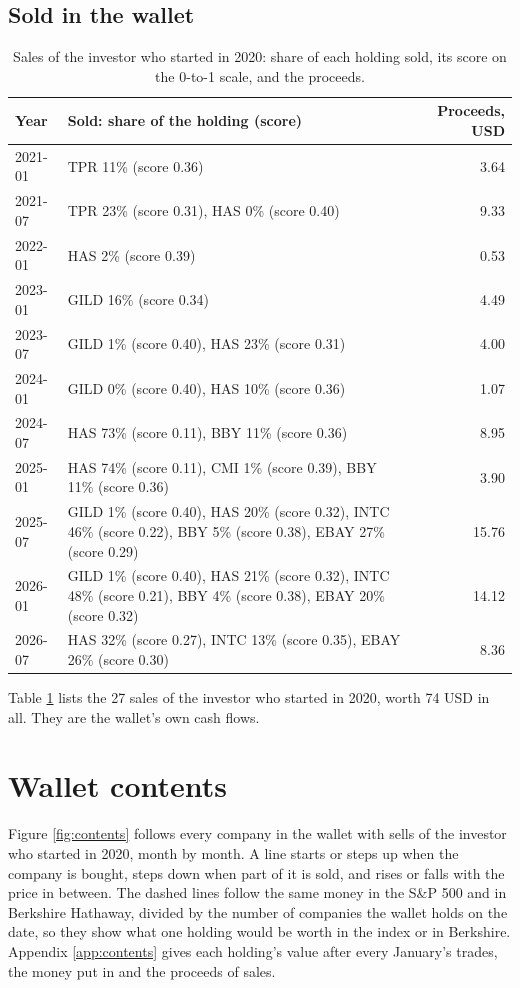 \documentclass[11pt,a4paper]{article}
\begin{document}
\subsection{Sold in the wallet}
\begin{table}[H]
\centering
\small
\caption{Sales of the investor who started in 2020: share of each holding sold, its score on the 0-to-1 scale, and the proceeds.}\label{tab:sales}
\begin{tabular}{l p{11cm} r}
\hline
Year & Sold: share of the holding (score) & Proceeds, USD \\
\hline
2021-01 & TPR 11\% (score 0.36) & 3.64 \\
2021-07 & TPR 23\% (score 0.31), HAS 0\% (score 0.40) & 9.33 \\
2022-01 & HAS 2\% (score 0.39) & 0.53 \\
2023-01 & GILD 16\% (score 0.34) & 4.49 \\
2023-07 & GILD 1\% (score 0.40), HAS 23\% (score 0.31) & 4.00 \\
2024-01 & GILD 0\% (score 0.40), HAS 10\% (score 0.36) & 1.07 \\
2024-07 & HAS 73\% (score 0.11), BBY 11\% (score 0.36) & 8.95 \\
2025-01 & HAS 74\% (score 0.11), CMI 1\% (score 0.39), BBY 11\% (score 0.36) & 3.90 \\
2025-07 & GILD 1\% (score 0.40), HAS 20\% (score 0.32), INTC 46\% (score 0.22), BBY 5\% (score 0.38), EBAY 27\% (score 0.29) & 15.76 \\
2026-01 & GILD 1\% (score 0.40), HAS 21\% (score 0.32), INTC 48\% (score 0.21), BBY 4\% (score 0.38), EBAY 20\% (score 0.32) & 14.12 \\
2026-07 & HAS 32\% (score 0.27), INTC 13\% (score 0.35), EBAY 26\% (score 0.30) & 8.36 \\
\hline
\end{tabular}
\end{table}
Table \ref{tab:sales} lists the 27 sales of the investor who started in 2020, worth 74 USD in all. They are the wallet's own cash flows.

\section{Wallet contents}
Figure \ref{fig:contents} follows every company in the wallet with sells of the investor who started in 2020, month by month. A line starts or steps up when the company is bought, steps down when part of it is sold, and rises or falls with the price in between. The dashed lines follow the same money in the S\&P 500 and in Berkshire Hathaway, divided by the number of companies the wallet holds on the date, so they show what one holding would be worth in the index or in Berkshire. Appendix \ref{app:contents} gives each holding's value after every January's trades, the money put in and the proceeds of sales.
\end{document}
